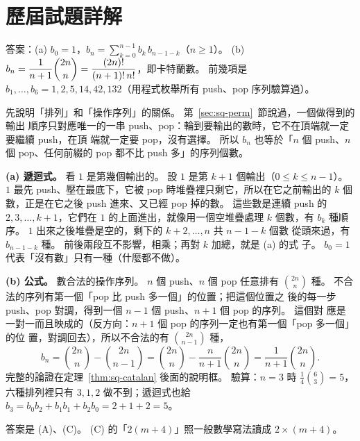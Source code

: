 \section*{歷屆試題詳解}

答案：(a) $b_0 = 1$，$b_n = \sum_{k=0}^{n-1} b_k\, b_{n-1-k}$（$n \ge 1$）。 (b) $b_n =
\dfrac{1}{n+1}\dbinom{2n}{n} = \dfrac{(2n)!}{(n+1)!\,n!}$，即卡特蘭數。 前幾項是
$b_1, \ldots, b_6 = 1, 2, 5, 14, 42, 132$（用程式枚舉所有 push、pop 序列驗算過）。

先說明「排列」和「操作序列」的關係。 第~\ref{sec:sq-perm}~節說過，一個做得到的輸出
順序只對應唯一的一串 push、pop：輪到要輸出的數時，它不在頂端就一定要繼續 push，在頂
端就一定要 pop，沒有選擇。 所以 $b_n$ 也等於「$n$ 個 push、$n$ 個 pop、任何前綴的 pop
都不比 push 多」的序列個數。

\textbf{(a) 遞迴式。} 看 $1$ 是第幾個輸出的。 設 $1$ 是第 $k + 1$ 個輸出（$0 \le k \le
n - 1$）。 $1$ 最先 push、壓在最底下，它被 pop 時堆疊裡只剩它，所以在它之前輸出的
$k$ 個數，正是在它之後 push 進來、又已經 pop 掉的數。 這些數是連續 push 的
$2, 3, \ldots, k + 1$，它們在 $1$ 的上面進出，就像用一個空堆疊處理 $k$ 個數，有
$b_k$ 種順序。 $1$ 出來之後堆疊是空的，剩下的 $k + 2, \ldots, n$ 共 $n - 1 - k$ 個數
從頭來過，有 $b_{n-1-k}$ 種。 前後兩段互不影響，相乘；再對 $k$ 加總，就是 (a) 的式
子。 $b_0 = 1$ 代表「沒有數」只有一種（什麼都不做）。

\textbf{(b) 公式。} 數合法的操作序列。 $n$ 個 push、$n$ 個 pop 任意排有
$\binom{2n}{n}$ 種。 不合法的序列有第一個「pop 比 push 多一個」的位置；把這個位置之
後的每一步 push、pop 對調，得到一個 $n - 1$ 個 push、$n + 1$ 個 pop 的序列。 這個對
應是一對一而且映成的（反方向：$n + 1$ 個 pop 的序列一定也有第一個「pop 多一個」的位
置，對調回去），所以不合法的有 $\binom{2n}{n-1}$ 種，
\[
b_n = \binom{2n}{n} - \binom{2n}{n-1} = \binom{2n}{n} - \frac{n}{n+1}\binom{2n}{n}
= \frac{1}{n+1}\binom{2n}{n}.
\]
完整的論證在定理~\ref{thm:sq-catalan} 後面的說明框。 驗算：$n = 3$ 時
$\frac{1}{4}\binom{6}{3} = 5$，六種排列裡只有 $3, 1, 2$ 做不到；遞迴式也給
$b_3 = b_0 b_2 + b_1 b_1 + b_2 b_0 = 2 + 1 + 2 = 5$。

答案是 (A)、(C)。 (C) 的「$2(m+4)$」照一般數學寫法讀成 $2 \times (m + 4)$。

